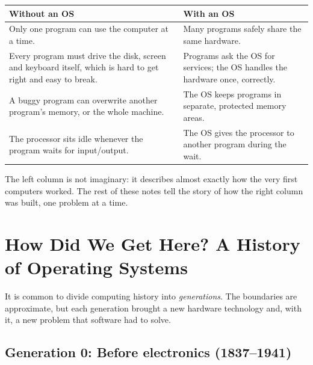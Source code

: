 \documentclass[11pt,a4paper]{article}
\begin{document}
\begin{center}
\renewcommand{\arraystretch}{1.35}
\begin{tabularx}{\linewidth}{>{\raggedright\arraybackslash}X >{\raggedright\arraybackslash}X}
\toprule
\textbf{\color{red!60!black}Without an OS} & \textbf{\color{mintdeep}With an OS} \\
\midrule
Only one program can use the computer at a time. & Many programs safely share the same hardware. \\
Every program must drive the disk, screen and keyboard itself, which is hard to get right and easy to break. & Programs ask the OS for services; the OS handles the hardware once, correctly. \\
A buggy program can overwrite another program's memory, or the whole machine. & The OS keeps programs in separate, protected memory areas. \\
The processor sits idle whenever the program waits for input/output. & The OS gives the processor to another program during the wait. \\
\bottomrule
\end{tabularx}
\end{center}

The left column is not imaginary: it describes almost exactly how the very first computers worked. The rest of these notes tell the story of how the right column was built, one problem at a time.

\section{How Did We Get Here? A History of Operating Systems}

It is common to divide computing history into \emph{generations}. The boundaries are approximate, but each generation brought a new hardware technology and, with it, a new problem that software had to solve.

\subsection{Generation 0: Before electronics (1837--1941)}
\end{document}
